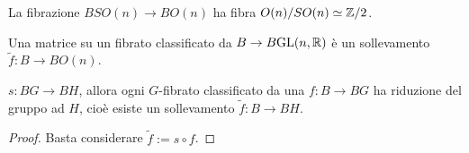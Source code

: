 \begin{ex}
	\item La fibrazione $BSO(n) \to BO(n)$ ha fibra $O(n)/SO(n) \simeq {\mathbb Z}/2$.
	
	\item Una matrice su un fibrato classificato da $B \to B\mathrm{GL}(n,{\mathbb R})$ 
	è un sollevamento $\widetilde{f}:B \to BO(n)$.
\end{ex}


\begin{prop}
	$s:BG \to BH$, allora ogni $G$-fibrato classificato da una $f:B \to BG$
	ha riduzione del gruppo ad $H$, cioè esiste un sollevamento $\widetilde{f}:B \to BH$.
	\begin{proof}
		Basta considerare $\widetilde{f} := s \circ f$.
	\end{proof}
\end{prop}

